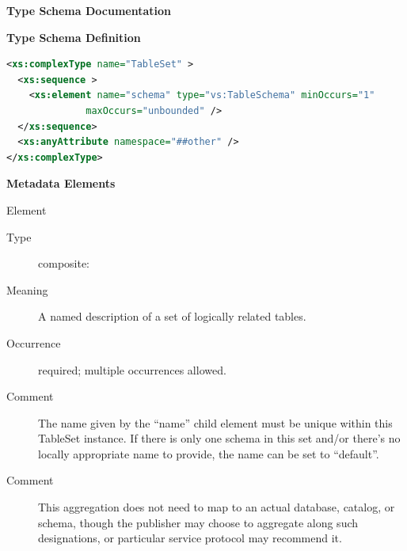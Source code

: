 \documentclass[11pt,a4paper]{ivoa}
\begin{document}
\begin{generated}
\begingroup
      	\renewcommand*\descriptionlabel[1]{%
      	\hbox to 5.5em{\emph{#1}\hfil}}\vspace{2ex}\noindent\textbf{ Type Schema Documentation}


\vspace{1ex}\noindent\textbf{ Type Schema Definition}

\begin{lstlisting}[language=XML,basicstyle=\footnotesize]
<xs:complexType name="TableSet" >
  <xs:sequence >
    <xs:element name="schema" type="vs:TableSchema" minOccurs="1"
              maxOccurs="unbounded" />
  </xs:sequence>
  <xs:anyAttribute namespace="##other" />
</xs:complexType>
\end{lstlisting}

\vspace{0.5ex}\noindent\textbf{ Metadata Elements}

\begingroup\small\begin{bigdescription}\item[Element \xmlel{schema}]
\begin{description}
\item[Type] composite: 
\item[Meaning] 
                A named description of a set of logically related tables.
              
\item[Occurrence] required; multiple occurrences allowed.
\item[Comment] 
                The name given by the “name” child element must
                be unique within this TableSet instance.  If there is
                only one schema in this set and/or there's no locally
                appropriate name to provide, the name can be set to
                “default”.  
              
\item[Comment] 
                This aggregation does not need to map to an
                actual database, catalog, or schema, though the
                publisher may choose to aggregate along such
                designations, or particular service protocol may
                recommend it.  
              

\end{description}


\end{bigdescription}\endgroup

\endgroup
\end{generated}
\end{document}
